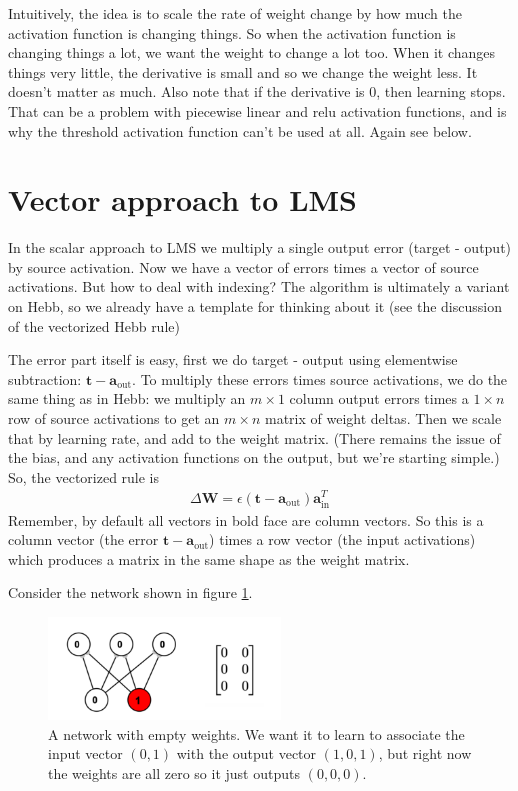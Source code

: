 Intuitively, the idea is to scale the rate of weight change by how much the activation function is changing things. So when the activation function is changing things a lot, we want the weight to change a lot too. When it changes things very little, the derivative is small and so we change the weight less. It doesn't matter as much. Also note that if the derivative is 0, then learning stops. That can be a problem with piecewise linear and relu activation functions, and is why the threshold activation function can't be used at all. Again see below.

\section{Vector approach to LMS}

In the scalar approach to LMS we multiply a single output error (target - output) by source activation. Now we have a vector of errors times a vector of source activations. But how to deal with indexing?  The algorithm is ultimately a variant on Hebb, so we already have a template for thinking about it (see the discussion of the vectorized Hebb rule)

The error part itself is easy, first we do target - output using elementwise subtraction: $\mathbf{t} - \mathbf{a}_{\text{out}}$. To multiply these errors times source activations, we do the same thing as in Hebb: we multiply an $m \times  1$ column output errors times a $1 \times  n$ row of source activations to get an $m \times n$ matrix of weight deltas. Then we scale that by learning rate, and add to the weight matrix. (There remains the issue of the bias, and any activation functions on the output, but we're starting simple.) So, the vectorized rule is
\begin{eqnarray*}
\Delta \mathbf{W}  =  \epsilon (\mathbf{t} - \mathbf{a}_{\text{out}}) \mathbf{a}_{\text{in}}^T
\end{eqnarray*}
Remember, by default all vectors in bold face are column vectors. So this is a column vector (the error $\mathbf{t} - \mathbf{a}_{\text{out}}$) times a row vector (the input activations) which produces a matrix in the same shape as the weight matrix.

Consider the network shown in figure \ref{lms_vector_pre}.

\begin{figure}[h]
\centering
\includegraphics[width=0.55\textwidth]{images/vectorLMSBeforeTrain.png}
\caption[Jeff Yoshimi.]{A network with empty weights. We want it to learn to associate the input vector $(0,1)$ with the output vector $(1,0,1)$, but right now the weights are all zero so it just outputs $(0,0,0)$. }
\label{lms_vector_pre}
\end{figure}

